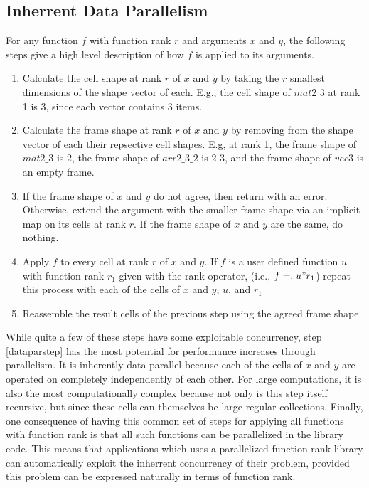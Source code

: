 \subsection{Inherrent Data Parallelism}
For any function $f$ with function rank $r$ and arguments $x$ and $y$, 
the following steps give a high level description of how $f$ is applied to its arguments.\cite{rankanduni}
\begin{enumerate}
	\item Calculate the cell shape at rank $r$ of $x$ and $y$ 
		by taking the $r$ smallest dimensions of the shape vector of each.
		E.g., the cell shape of $mat2\_3$ at rank 1 is 3, since each vector contains 3 items.
	\item Calculate the frame shape at rank $r$ of $x$ and $y$ 
		by removing from the shape vector of each their repsective cell shapes.
		E.g, at rank 1, the frame shape of $mat2\_3$ is $2$,
		the frame shape of $arr2\_3\_2$ is $2$ $3$, 
		and the frame shape of $vec3$ is an empty frame.
	\item If the frame shape of $x$ and $y$ do not agree, then return with an error.
		Otherwise, extend the argument with the smaller frame shape via an implicit map on its cells at rank $r$.
		If the frame shape of $x$ and $y$ are the same, do nothing.
	\item \label{dataparstep}Apply $f$ to every cell at rank $r$ of $x$ and $y$.
		If $f$ is a user defined function $u$ with function rank $r_1$ given with the rank operator,
		(i.e., $f =: u"r_1$)
		repeat this process with each of the cells of $x$ and $y$, $u$, and $r_1$
	\item Reassemble the result cells of the previous step using the agreed frame shape.
\end{enumerate}

While quite a few of these steps have some exploitable concurrency, 
step \ref{dataparstep} has the most potential for performance increases through parallelism.
It is inherently data parallel because each of the cells of $x$ and $y$ are operated on completely independently of each other.
For large computations, it is also the most computationally complex 
because not only is this step itself recursive, but
since these cells can themselves be large regular collections.
Finally, one consequence of having this common set of steps for applying all functions with function rank is
that all such functions can be parallelized in the library code.
This means that applications which uses a parallelized function rank library 
can automatically exploit the inherrent concurrency of their problem, 
provided this problem can be expressed naturally in terms of function rank.

